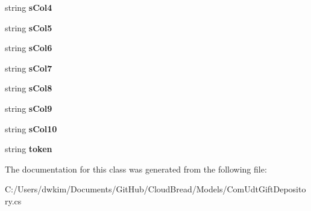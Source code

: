 \begin{DoxyCompactItemize}
\item 
string {\bfseries s\+Col4}\hypertarget{a00068_a11cd4e2b57b8a4af23d82a4b680872c5}{}\label{a00068_a11cd4e2b57b8a4af23d82a4b680872c5}

\item 
string {\bfseries s\+Col5}\hypertarget{a00068_aadfbb931d19e946216a8adbd3643a975}{}\label{a00068_aadfbb931d19e946216a8adbd3643a975}

\item 
string {\bfseries s\+Col6}\hypertarget{a00068_aa9537a3145539870358260702292ef7e}{}\label{a00068_aa9537a3145539870358260702292ef7e}

\item 
string {\bfseries s\+Col7}\hypertarget{a00068_a63c2d375d2994f17bf40f55c3c441849}{}\label{a00068_a63c2d375d2994f17bf40f55c3c441849}

\item 
string {\bfseries s\+Col8}\hypertarget{a00068_a24c5a7c188b8c35c39309623cb7bab49}{}\label{a00068_a24c5a7c188b8c35c39309623cb7bab49}

\item 
string {\bfseries s\+Col9}\hypertarget{a00068_a44b035f0cc59f049b20631f15ec12494}{}\label{a00068_a44b035f0cc59f049b20631f15ec12494}

\item 
string {\bfseries s\+Col10}\hypertarget{a00068_a878a7b9f3074f57a8f799b32571dd7e3}{}\label{a00068_a878a7b9f3074f57a8f799b32571dd7e3}

\item 
string {\bfseries token}\hypertarget{a00068_ad829e53bc7642610dd2d01333856dde0}{}\label{a00068_ad829e53bc7642610dd2d01333856dde0}

\end{DoxyCompactItemize}


The documentation for this class was generated from the following file\+:\begin{DoxyCompactItemize}
\item 
C\+:/\+Users/dwkim/\+Documents/\+Git\+Hub/\+Cloud\+Bread/\+Models/Com\+Udt\+Gift\+Depository.\+cs\end{DoxyCompactItemize}
